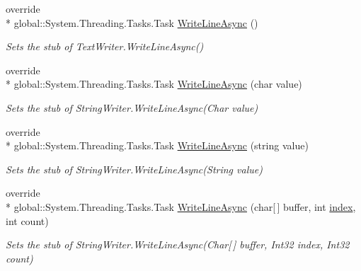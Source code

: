\begin{DoxyCompactItemize}
override \\*
global\-::\-System.\-Threading.\-Tasks.\-Task \hyperlink{class_system_1_1_i_o_1_1_fakes_1_1_stub_string_writer_a2e6af4ec832065e6c6c7d800bd4ee3e8}{Write\-Line\-Async} ()
\begin{DoxyCompactList}\small\item\em Sets the stub of Text\-Writer.\-Write\-Line\-Async()\end{DoxyCompactList}\item 
override \\*
global\-::\-System.\-Threading.\-Tasks.\-Task \hyperlink{class_system_1_1_i_o_1_1_fakes_1_1_stub_string_writer_a8b6db42a5d00f140e13f9a8b755c643a}{Write\-Line\-Async} (char value)
\begin{DoxyCompactList}\small\item\em Sets the stub of String\-Writer.\-Write\-Line\-Async(\-Char value)\end{DoxyCompactList}\item 
override \\*
global\-::\-System.\-Threading.\-Tasks.\-Task \hyperlink{class_system_1_1_i_o_1_1_fakes_1_1_stub_string_writer_a8cedd83be2a202999a7cd36f50c54646}{Write\-Line\-Async} (string value)
\begin{DoxyCompactList}\small\item\em Sets the stub of String\-Writer.\-Write\-Line\-Async(\-String value)\end{DoxyCompactList}\item 
override \\*
global\-::\-System.\-Threading.\-Tasks.\-Task \hyperlink{class_system_1_1_i_o_1_1_fakes_1_1_stub_string_writer_a24e40505e5ba60b81693867092851725}{Write\-Line\-Async} (char\mbox{[}$\,$\mbox{]} buffer, int \hyperlink{jquery-1_810_82-vsdoc_8js_a75bb12d1f23302a9eea93a6d89d0193e}{index}, int count)
\begin{DoxyCompactList}\small\item\em Sets the stub of String\-Writer.\-Write\-Line\-Async(\-Char\mbox{[}$\,$\mbox{]} buffer, Int32 index, Int32 count)\end{DoxyCompactList}\end{DoxyCompactItemize}
